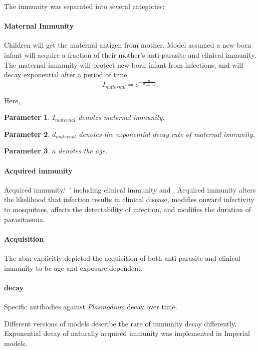 \documentclass[a4paper, 12pt, twoside]{article}
\newtheorem{parameter}{Parameter}
\begin{document}
The immunity was separated into several categories:

\paragraph{Maternal Immunity}%
\label{par:maternal_immunity}
Children will get the maternal antigen from mother.
Model assumed a new-born infant will acquire a fraction of their mother’s anti-parasite and clinical immunity.
The maternal immunity will protect new born infant from infections, and will decay exponential after a period of time.
\[
	I_{maternal} = e^{- \frac{a}{d_{maternal}}}
	.\]

Here,

\begin{parameter}
	{$I_{maternal}$}
	{denotes maternal immunity.}
\end{parameter}
\begin{parameter}
	{$d_{maternal}$}
	{denotes the exponential decay rate of maternal immunity.}
\end{parameter}
\begin{parameter}
	{$a$}
	{denotes the age.}
\end{parameter}

\paragraph{Acquired immunity}%
\label{par:acquired_immunity}
Acquired immunity.`\ ' including clinical immunity and .
Acquired immunity alters the likelihood that infection results in clinical disease, modifies onward infectivity to mosquitoes, affects the detectability of infection, and modifies the duration of parasitaemia.

\paragraph{Acquisition}%
\label{par:acquisition}
The \gls{abm} explicitly depicted the acquisition of both anti-parasite and clinical immunity to be age and exposure dependent.

\paragraph{decay}%
\label{par:decay}
Specific antibodies against \textit{Plasmodium} decay over time.

Different versions of models describe the rate of immunity decay differently.
Exponential decay of naturally acquired immunity was implemented in Imperial models.
\end{document}
